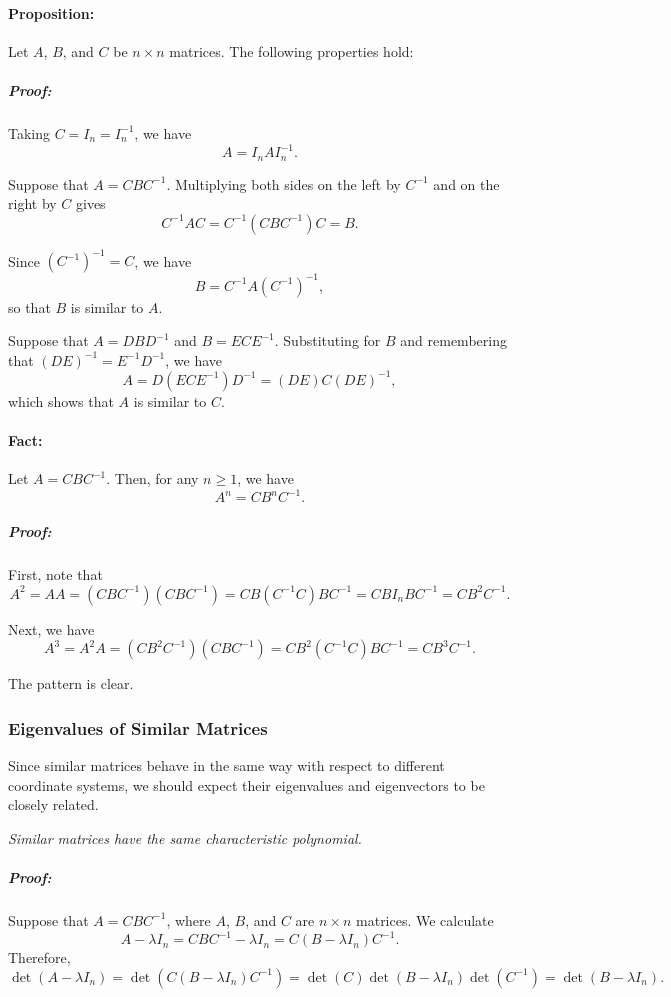 \documentclass[a4paper,12pt]{article}
\begin{document}
\paragraph{Proposition:}Let \(A\), \(B\), and \(C\) be \(n \times n\) matrices. The following properties hold:
\subparagraph{Proof:}Taking \(C = I_n = I_n^{-1}\), we have 
\[
A = I_n A I_n^{-1}.
\]

Suppose that \(A = C B C^{-1}\). Multiplying both sides on the left by \(C^{-1}\) and on the right by \(C\) gives
\[
C^{-1} A C = C^{-1} (C B C^{-1}) C = B.
\]

Since \((C^{-1})^{-1} = C\), we have 
\[
B = C^{-1} A (C^{-1})^{-1},
\]
so that \(B\) is similar to \(A\).

Suppose that \(A = D B D^{-1}\) and \(B = E C E^{-1}\). Substituting for \(B\) and remembering that \((DE)^{-1} = E^{-1} D^{-1}\), we have
\[
A = D (E C E^{-1}) D^{-1} = (DE) C (DE)^{-1},
\]
which shows that \(A\) is similar to \(C\).

\paragraph{Fact:}Let \(A = C B C^{-1}\). Then, for any \(n \geq 1\), we have
\[
A^n = C B^n C^{-1}.
\]

\subparagraph{Proof:}First, note that 
\[
A^2 = A A = (C B C^{-1})(C B C^{-1}) = C B (C^{-1} C) B C^{-1} = C B I_n B C^{-1} = C B^2 C^{-1}.
\]

Next, we have
\[
A^3 = A^2 A = (C B^2 C^{-1})(C B C^{-1}) = C B^2 (C^{-1} C) B C^{-1} = C B^3 C^{-1}.
\]

The pattern is clear.
\subsubsection{Eigenvalues of Similar Matrices}Since similar matrices behave in the same way with respect to different coordinate systems, we should expect their eigenvalues and eigenvectors to be closely related.
\begin{tcolorbox}[title=Fact,colframe=blue!70!black, colback=blue!5!white]
\textit{Similar matrices have the same characteristic polynomial.}
\end{tcolorbox}
\subparagraph{Proof:}Suppose that \( A = CBC^{-1} \), where \( A \), \( B \), and \( C \) are \( n \times n \) matrices. We calculate
\[
A - \lambda I_n = CBC^{-1} - \lambda I_n = C(B - \lambda I_n)C^{-1}.
\]
Therefore, 
\[
\det(A - \lambda I_n) = \det(C(B - \lambda I_n)C^{-1}) = \det(C) \det(B - \lambda I_n) \det(C^{-1}) = \det(B - \lambda I_n).
\]
\end{document}
